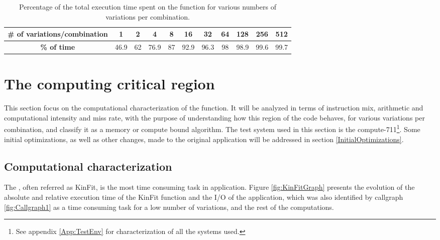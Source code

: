 \begin{table}[!htp]
	\begin{center}
		\begin{tabular}{|c|c|c|c|c|c|c|c|c|c|c|}
			\hline
			\textbf{# of variations/combination} & 1 & 2 & 4 & 8 & 16 & 32 & 64 & 128 & 256 & 512 \\ \hline
			\textbf{\% of time} & 46.9 & 62 & 76.9 & 87 & 92.9 & 96.3 & 98 & 98.9 & 99.6 & 99.7 \\ \hline
		\end{tabular}
		\caption{Percentage of the total execution time spent on the \ttDilepKinFit function for various numbers of variations per combination.}
		\label{tab:TempoKinFit}
	\end{center}
\end{table}

\section{The computing critical region}
\label{CriticalRegion}

This section focus on the computational characterization of the \ttDilepKinFit function. It will be analyzed in terms of instruction mix, arithmetic and computational intensity and miss rate, with the purpose of understanding how this region of the code behaves, for various variations per combination, and classify it as a memory or compute bound algorithm. The test system used in this section is the compute-711\footnote{See appendix \ref{App:TestEnv} for characterization of all the systems used.}. Some initial optimizations, as well as other changes, made to the original application will be addressed in section \ref{InitialOptimizations}.

\subsection{Computational characterization}
\label{ComputationalCharactrization}

The \ttDilepKinFit, often referred as KinFit, is the most time consuming task in \tth application. Figure \ref{fig:KinFitGraph} presents the evolution of the absolute and relative execution time of the KinFit function and the I/O of the application, which was also identified by callgraph \ref{fig:Callgraph1} as a time consuming task for a low number of variations, and the rest of the computations.

